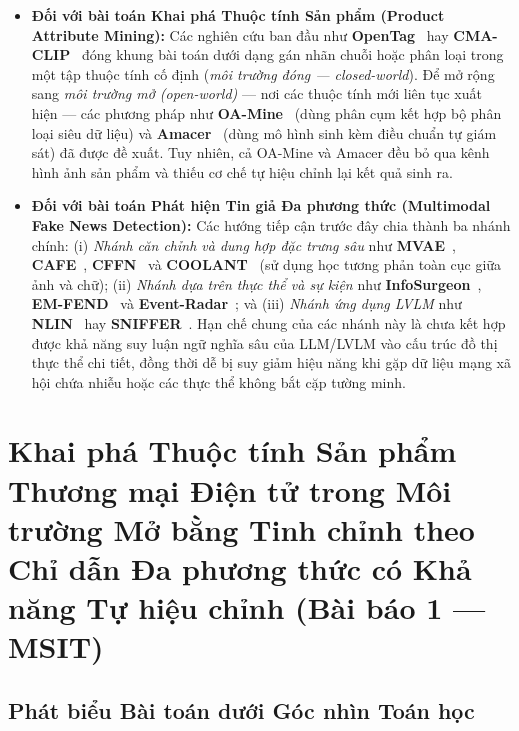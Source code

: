 \documentclass[conference,10pt]{IEEEtran}
\begin{document}
\begin{itemize}
    \item \textbf{Đối với bài toán Khai phá Thuộc tính Sản phẩm (Product Attribute Mining):} Các nghiên cứu ban đầu như \textbf{OpenTag}~\cite{zheng2018opentag} hay \textbf{CMA-CLIP}~\cite{fu2022cmaclip} đóng khung bài toán dưới dạng gán nhãn chuỗi hoặc phân loại trong một tập thuộc tính cố định (\textit{môi trường đóng --- closed-world}). Để mở rộng sang \textit{môi trường mở (open-world)} --- nơi các thuộc tính mới liên tục xuất hiện --- các phương pháp như \textbf{OA-Mine}~\cite{zhang2022oamine} (dùng phân cụm kết hợp bộ phân loại siêu dữ liệu) và \textbf{Amacer}~\cite{xu2023amacer} (dùng mô hình sinh kèm điều chuẩn tự giám sát) đã được đề xuất. Tuy nhiên, cả OA-Mine và Amacer đều bỏ qua kênh hình ảnh sản phẩm và thiếu cơ chế tự hiệu chỉnh lại kết quả sinh ra.
    \item \textbf{Đối với bài toán Phát hiện Tin giả Đa phương thức (Multimodal Fake News Detection):} Các hướng tiếp cận trước đây chia thành ba nhánh chính: (i) \textit{Nhánh căn chỉnh và dung hợp đặc trưng sâu} như \textbf{MVAE}~\cite{khattar2019mvae}, \textbf{CAFE}~\cite{chen2022cafe}, \textbf{CFFN}~\cite{li2023cffn} và \textbf{COOLANT}~\cite{wang2023coolant} (sử dụng học tương phản toàn cục giữa ảnh và chữ); (ii) \textit{Nhánh dựa trên thực thể và sự kiện} như \textbf{InfoSurgeon}~\cite{fung2021infosurgeon}, \textbf{EM-FEND}~\cite{qi2021emfend} và \textbf{Event-Radar}~\cite{ma2024eventradar}; và (iii) \textit{Nhánh ứng dụng LVLM} như \textbf{NLIN}~\cite{zhang2024nlin} hay \textbf{SNIFFER}~\cite{qi2024sniffer}. Hạn chế chung của các nhánh này là chưa kết hợp được khả năng suy luận ngữ nghĩa sâu của LLM/LVLM vào cấu trúc đồ thị thực thể chi tiết, đồng thời dễ bị suy giảm hiệu năng khi gặp dữ liệu mạng xã hội chứa nhiễu hoặc các thực thể không bắt cặp tường minh.
\end{itemize}

\section{Khai phá Thuộc tính Sản phẩm Thương mại Điện tử trong Môi trường Mở bằng Tinh chỉnh theo Chỉ dẫn Đa phương thức có Khả năng Tự hiệu chỉnh (Bài báo 1 --- MSIT)}

\subsection{Phát biểu Bài toán dưới Góc nhìn Toán học}
\end{document}
